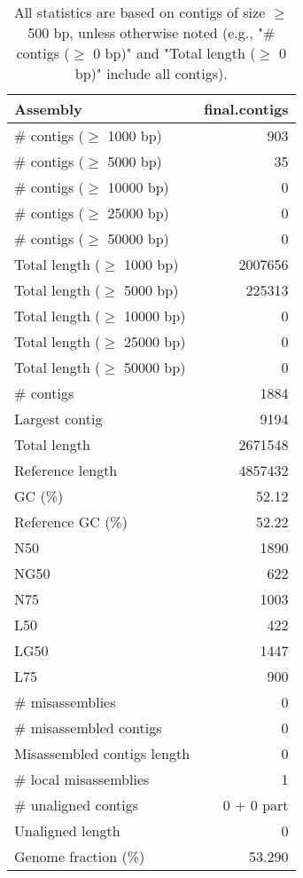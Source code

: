 \documentclass[12pt,a4paper]{article}
\begin{document}
\begin{table}[ht]
\begin{center}
\caption{All statistics are based on contigs of size $\geq$ 500 bp, unless otherwise noted (e.g., "\# contigs ($\geq$ 0 bp)" and "Total length ($\geq$ 0 bp)" include all contigs).}
\begin{tabular}{|l*{1}{|r}|}
\hline
Assembly & final.contigs \\ \hline
\# contigs ($\geq$ 1000 bp) & 903 \\ \hline
\# contigs ($\geq$ 5000 bp) & 35 \\ \hline
\# contigs ($\geq$ 10000 bp) & 0 \\ \hline
\# contigs ($\geq$ 25000 bp) & 0 \\ \hline
\# contigs ($\geq$ 50000 bp) & 0 \\ \hline
Total length ($\geq$ 1000 bp) & 2007656 \\ \hline
Total length ($\geq$ 5000 bp) & 225313 \\ \hline
Total length ($\geq$ 10000 bp) & 0 \\ \hline
Total length ($\geq$ 25000 bp) & 0 \\ \hline
Total length ($\geq$ 50000 bp) & 0 \\ \hline
\# contigs & 1884 \\ \hline
Largest contig & 9194 \\ \hline
Total length & 2671548 \\ \hline
Reference length & 4857432 \\ \hline
GC (\%) & 52.12 \\ \hline
Reference GC (\%) & 52.22 \\ \hline
N50 & 1890 \\ \hline
NG50 & 622 \\ \hline
N75 & 1003 \\ \hline
L50 & 422 \\ \hline
LG50 & 1447 \\ \hline
L75 & 900 \\ \hline
\# misassemblies & 0 \\ \hline
\# misassembled contigs & 0 \\ \hline
Misassembled contigs length & 0 \\ \hline
\# local misassemblies & 1 \\ \hline
\# unaligned contigs & 0 + 0 part \\ \hline
Unaligned length & 0 \\ \hline
Genome fraction (\%) & 53.290 \\ \hline

\end{tabular}
\end{center}
\end{table}
\end{document}
